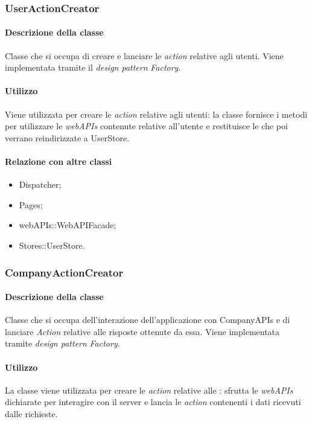 \subsubsection{UserActionCreator}
\paragraph*{Descrizione della classe}
Classe che si occupa di creare e lanciare le \textit{action} relative agli utenti. Viene implementata tramite il \textit{design pattern} \textit{Factory}.
\paragraph*{Utilizzo}
Viene utilizzata per creare le \textit{action} relative agli utenti: la classe fornisce i metodi per utilizzare le \textit{webAPIs} contenute relative all'utente e restituisce le  che poi verrano reindirizzate a UserStore.

\paragraph*{Relazione con altre classi}
\begin{itemize}
\item Dispatcher;
\item Pages;
\item webAPIs::WebAPIFacade;
\item Stores::UserStore.
\end{itemize}

\subsubsection{CompanyActionCreator}
\paragraph*{Descrizione della classe}
Classe che si occupa dell'interazione dell'applicazione con CompanyAPIs e di lanciare \textit{Action} relative alle risposte ottenute da essa. Viene implementata tramite \textit{design pattern} \textit{Factory}.
\paragraph*{Utilizzo}
La classe viene utilizzata per creare le \textit{action} relative alle : sfrutta le \textit{webAPIs} dichiarate per interagire con il server e lancia le \textit{action} contenenti i dati ricevuti dalle  richieste.

